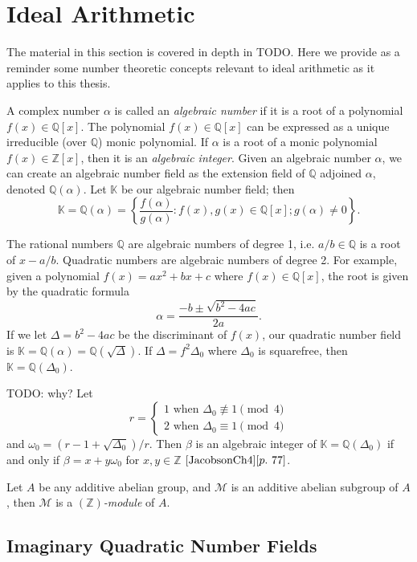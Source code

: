 \documentclass[11pt, letterpaper]{book}
\theoremstyle{definition}
\newcommand{\KK}{\mathbb{K}}
\newcommand{\MM}{\mathcal{M}}
\newcommand{\ZZ}{\mathbb{Z}}
\newcommand{\QQ}{\mathbb{Q}}
\begin{document}
\setcounter{chapter}{1}
\chapter{Ideal Arithmetic}


The material in this section is covered in depth in TODO.  Here we provide as a reminder some number theoretic concepts relevant to ideal arithmetic as it applies to this thesis.


\bigbreak
A complex number $\alpha$ is called an \emph{algebraic number} if it is a root of a polynomial $f(x) \in \QQ[x]$.  The polynomial $f(x) \in \QQ[x]$ can be expressed as a unique irreducible (over $\QQ$) monic polynomial.  If $\alpha$ is a root of a monic polynomial $f(x) \in \ZZ[x]$, then it is an \emph{algebraic integer}.  Given an algebraic number $\alpha$, we can create an algebraic number field as the extension field of $\QQ$ adjoined $\alpha$, denoted $\QQ(\alpha)$. Let $\KK$ be our algebraic number field; then
\[
	\KK = \QQ(\alpha) = \left\{ \frac{f(\alpha)}{g(\alpha)} : f(x), g(x) \in \QQ[x]; g(\alpha) \ne 0 \right\}.
\]


\bigbreak
The rational numbers $\QQ$ are algebraic numbers of degree 1, i.e. $a/b \in \QQ$ is a root of $x - a/b$.  Quadratic numbers are algebraic numbers of degree 2.  For example, given a polynomial $f(x) = ax^2 + bx + c$ where $f(x) \in \QQ[x]$, the root is given by the quadratic formula
\[
	\alpha = \frac{-b \pm \sqrt{b^2 - 4ac}}{2a}.
\]
If we let $\Delta = b^2 -4ac$ be the discriminant of $f(x)$, our quadratic number field is $\KK = \QQ(\alpha) = \QQ(\sqrt{\Delta})$.  If $\Delta = f^2 \Delta_0$ where $\Delta_0$ is squarefree, then $\KK = \QQ(\Delta_0)$.

\bigbreak
TODO: why?
Let
\[
	r = \begin{cases}
		1 \textrm{ when } \Delta_0 \not \equiv 1 \pmod 4 \\
		2 \textrm{ when } \Delta_0 \equiv 1 \pmod 4
	\end{cases}
\]
and $\omega_0 = (r-1+\sqrt{\Delta_0})/r$.  Then $\beta$ is an algebraic integer of $\KK = \QQ(\Delta_0)$ if and only if $\beta = x + y \omega_0$ for $x,y \in \ZZ$ $\cite{JacobsonCh4}[p.~77]$.

\bigbreak
Let $A$ be any additive abelian group, and $\MM$ is an additive abelian subgroup of $A$, then $\MM$ is a \emph{$(\ZZ)$-module} of $A$.



\section{Imaginary Quadratic Number Fields}
\end{document}

